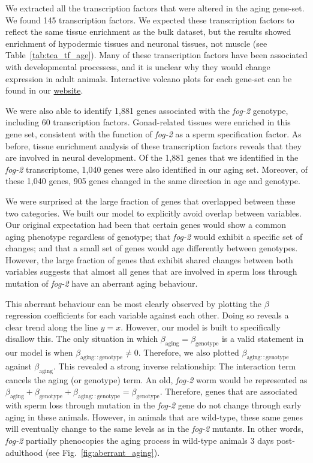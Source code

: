 \documentclass[9pt,twocolumn,twoside]{gsag3jnl}
\newcommand{\fog}{\emph{fog-2}}
\newcommand{\fogn}{1,881}
\newcommand{\coexpressed}{905}
\newcommand{\intersectn}{1,040}
\newcommand{\tfaging}{145}
\newcommand{\tffog}{60}
\newcommand{\webref}{
\href{https://wormlabcaltech.github.io/Angeles_Leighton_2016/}{website}}
\begin{document}
We extracted all the transcription factors that were altered in the aging gene-set. We found \tfaging{} transcription factors. We expected these transcription factors to reflect the same tissue enrichment as the bulk dataset, but the results showed enrichment of hypodermic tissues and neuronal tissues, not muscle (see Table~\ref{tab:tea_tf_age}). Many of these transcription factors have been  associated with developmental processess, and it is unclear why they would change expression in adult animals. Interactive volcano plots for each gene-set can be found in our \webref{}.

We were also able to identify \fogn{} genes associated with the \fog{} genotype, including \tffog{} transcription factors. Gonad-related tissues were enriched in this gene set, consistent with the function of \fog{} as a sperm specification factor. As before, tissue enrichment analysis of these transcription factors reveals that they are involved in neural development. Of the \fogn{} genes that we identified in the \fog{} transcriptome, \intersectn{} genes were also identified in our aging set. Moreover, of these \intersectn{}  genes, \coexpressed{} genes changed in the same direction in age and genotype.

We were surprised at the large fraction of genes that overlapped between these two categories. We built our model to explicitly avoid overlap between variables. Our original expectation had been that certain genes would show a common aging phenotype regardless of genotype; that \fog{} would exhibit a specific set of changes; and that a small set of genes would age differently between genotypes. However, the large fraction of genes that exhibit shared changes between both variables suggests that almost all genes that are involved in sperm loss through mutation of \fog{} have an aberrant aging behaviour.

This aberrant behaviour can be most clearly observed by plotting the $\beta$ regression coefficients for each variable against each other. Doing so reveals a clear trend along the line $y=x$. However, our model is built to specifically disallow this. The only situation in which $\beta_\mathrm{aging} = \beta_\mathrm{genotype}$ is a valid statement in our model is when $\beta_\mathrm{aging::genotype} \neq 0$. Therefore, we also plotted $\beta_\mathrm{aging::genotype}$ against $\beta_\mathrm{aging}$. This revealed a strong inverse relationship: The interaction term cancels the aging (or genotype) term. An old, \fog{} worm would be represented as
$\beta_\mathrm{aging} +\beta_\mathrm{genotype} + \beta_\mathrm{aging::genotype} = \beta_\mathrm{genotype}$.
Therefore, genes that are associated with sperm loss through mutation in the \fog{} gene do not change through early aging in these animals. However, in animals that are wild-type, these same genes will eventually change to the same levels as in the \fog{} mutants. In other words, \fog{} partially phenocopies the aging process in wild-type animals 3 days post-adulthood (see Fig.~\ref{fig:aberrant_aging}).
\end{document}
